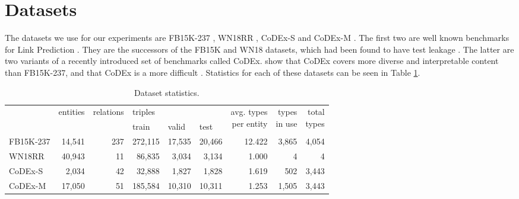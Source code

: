 \section{Datasets}
The datasets we use for our experiments are FB15K-237 , WN18RR , CoDEx-S and CoDEx-M .
%
The first two are well known benchmarks for Link Prediction .
They are the successors of the FB15K and WN18 datasets, which had been found to have test leakage .
The latter are two variants of a recently introduced set of benchmarks called CoDEx.  \citeauthor{safavi_codex_2020} show that CoDEx covers more diverse and interpretable content than FB15K-237, and that CoDEx is a more difficult . 
Statistics for each of these datasets can be seen in Table \ref{tab:dataset_statistics}.

\vspace{3cm}
\begin{table}
\centering
    \begin{tabular}{@{}lrrrrrrrr@{}}
    \toprule
    \multirow{2}{*}{} &
      \multicolumn{1}{l}{\multirow{2}{*}{entities}} &
      \multicolumn{1}{l}{\multirow{2}{*}{relations}} &
      \multicolumn{3}{l}{triples} &
      \multirow{2}{*}{\parbox{4.70em}{\vspace{4pt}avg. types\\per entity}} &
      \multirow{2}{*}{\parbox{2.75em}{\vspace{1pt}types\\in use}} &
      \multirow{2}{*}{\parbox{2.50em}{\vspace{3pt}total\\types}} \\
    \cmidrule(lr){4-6}
     &
      \multicolumn{1}{l}{} &
      \multicolumn{1}{l}{} &
      \multicolumn{1}{l}{train} &
      \multicolumn{1}{l}{valid} &
      \multicolumn{1}{l}{test} &
       &
       \\ \midrule
    FB15K-237 & 14,541 & 237 & 272,115 & 17,535 & 20,466 & 12.422 & 3,865 & 4,054 \\
    WN18RR    & 40,943 &  11 &  86,835 &  3,034 &  3,134 &  1.000 &     4 &     4 \\
    CoDEx-S   &  2,034 &  42 &  32,888 &  1,827 &  1,828 &  1.619 &   502 & 3,443 \\
    CoDEx-M   & 17,050 &  51 & 185,584 & 10,310 & 10,311 &  1.253 & 1,505 & 3,443 \\ 
    \bottomrule
    \end{tabular}\vspace{1em}
\caption{Dataset statistics.}
\label{tab:dataset_statistics}
\end{table}



